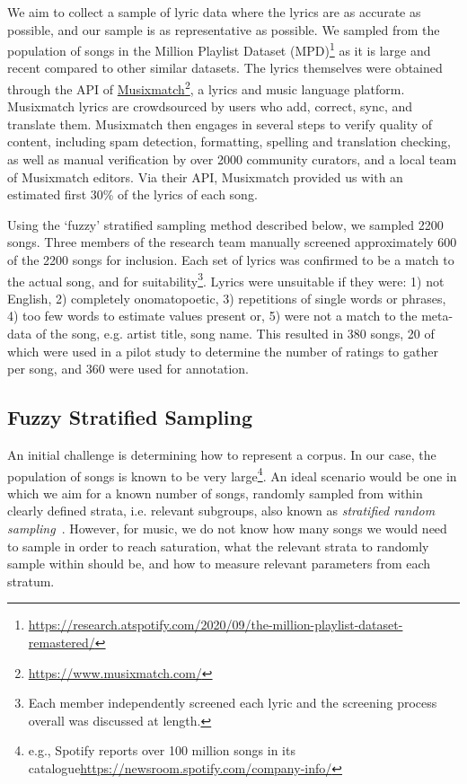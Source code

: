 \documentclass{article}
\begin{document}
We aim to collect a sample of lyric data where the lyrics are as accurate as possible, and our sample is as representative as possible. We sampled from the population of songs in the Million Playlist Dataset (MPD)\footnote{\url{https://research.atspotify.com/2020/09/the-million-playlist-dataset-remastered/}} as it is large and recent compared to other similar datasets. The lyrics themselves were obtained through the API of \href{https://www.musixmatch.com/}{Musixmatch}\footnote{\url{https://www.musixmatch.com/}}, a lyrics and music language platform. Musixmatch lyrics are crowdsourced by users who add, correct, sync, and translate them. Musixmatch then engages in several steps to verify quality of content, including spam detection, formatting, spelling and translation checking, as well as manual verification by over 2000 community curators, and a local team of Musixmatch editors. Via their API, Musixmatch provided us with an estimated first 30\% of the lyrics of each song. 

Using the `fuzzy' stratified sampling method described below, we sampled 2200 songs. Three members of the research team manually screened approximately 600 of the 2200 songs for inclusion. Each set of lyrics was confirmed to be a match to the actual song, and for suitability\footnote{Each member independently screened each lyric and the screening process overall was discussed at length.}. Lyrics were unsuitable if they were: 1) not English, 2) completely onomatopoetic, 3) repetitions of single words or phrases, 4) too few words to estimate values present or, 5) were not a match to the meta-data of the song, e.g. artist title, song name. This resulted in 380 songs, 20 of which were used in a pilot study to determine the number of ratings to gather per song, and 360 were used for annotation. 

\subsection{Fuzzy Stratified Sampling}\label{sec:primarylyricdata:fuzzysampling}

An initial challenge is determining how to represent a corpus. In our case, the population of songs is known to be very large\footnote{e.g., Spotify reports over 100 million songs in its catalogue\url{https://newsroom.spotify.com/company-info/}}. An ideal scenario would be one in which we aim for a known number of songs, randomly sampled from within clearly defined strata, i.e. relevant subgroups, also known as \textit{stratified random sampling}~\cite{groves2009survey}. However, for music, we do not know how many songs we would need to sample in order to reach saturation, what the relevant strata to randomly sample within should be, and how to measure relevant parameters from each stratum. 
\end{document}
